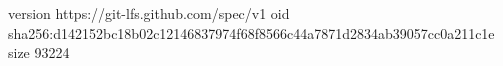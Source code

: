 version https://git-lfs.github.com/spec/v1
oid sha256:d142152bc18b02c12146837974f68f8566c44a7871d2834ab39057cc0a211c1e
size 93224
